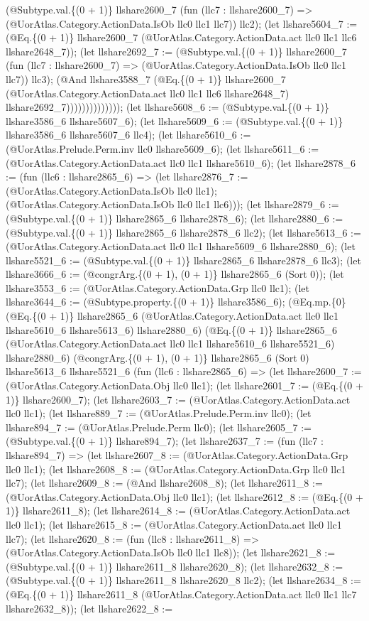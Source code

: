 \documentclass[11pt]{article}
\begin{document}
(@Subtype.val.\{(0 + 1)\} llshare2600\_7 (fun (llc7 : llshare2600\_7) => (@UorAtlas.Category.ActionData.IsOb llc0 llc1 llc7)) llc2); (let llshare5604\_7 := (@Eq.\{(0 + 1)\} llshare2600\_7 (@UorAtlas.Category.ActionData.act llc0 llc1 llc6 llshare2648\_7)); (let llshare2692\_7 := (@Subtype.val.\{(0 + 1)\} llshare2600\_7 (fun (llc7 : llshare2600\_7) => (@UorAtlas.Category.ActionData.IsOb llc0 llc1 llc7)) llc3); (@And llshare3588\_7 (@Eq.\{(0 + 1)\} llshare2600\_7 (@UorAtlas.Category.ActionData.act llc0 llc1 llc6 llshare2648\_7) llshare2692\_7)))))))))))))); (let llshare5608\_6 := (@Subtype.val.\{(0 + 1)\} llshare3586\_6 llshare5607\_6); (let llshare5609\_6 := (@Subtype.val.\{(0 + 1)\} llshare3586\_6 llshare5607\_6 llc4); (let llshare5610\_6 := (@UorAtlas.Prelude.Perm.inv llc0 llshare5609\_6); (let llshare5611\_6 := (@UorAtlas.Category.ActionData.act llc0 llc1 llshare5610\_6); (let llshare2878\_6 := (fun (llc6 : llshare2865\_6) => (let llshare2876\_7 := (@UorAtlas.Category.ActionData.IsOb llc0 llc1); (@UorAtlas.Category.ActionData.IsOb llc0 llc1 llc6))); (let llshare2879\_6 := (@Subtype.val.\{(0 + 1)\} llshare2865\_6 llshare2878\_6); (let llshare2880\_6 := (@Subtype.val.\{(0 + 1)\} llshare2865\_6 llshare2878\_6 llc2); (let llshare5613\_6 := (@UorAtlas.Category.ActionData.act llc0 llc1 llshare5609\_6 llshare2880\_6); (let llshare5521\_6 := (@Subtype.val.\{(0 + 1)\} llshare2865\_6 llshare2878\_6 llc3); (let llshare3666\_6 := (@congrArg.\{(0 + 1), (0 + 1)\} llshare2865\_6 (Sort 0)); (let llshare3553\_6 := (@UorAtlas.Category.ActionData.Grp llc0 llc1); (let llshare3644\_6 := (@Subtype.property.\{(0 + 1)\} llshare3586\_6); (@Eq.mp.\{0\} (@Eq.\{(0 + 1)\} llshare2865\_6 (@UorAtlas.Category.ActionData.act llc0 llc1 llshare5610\_6 llshare5613\_6) llshare2880\_6) (@Eq.\{(0 + 1)\} llshare2865\_6 (@UorAtlas.Category.ActionData.act llc0 llc1 llshare5610\_6 llshare5521\_6) llshare2880\_6) (@congrArg.\{(0 + 1), (0 + 1)\} llshare2865\_6 (Sort 0) llshare5613\_6 llshare5521\_6 (fun (llc6 : llshare2865\_6) => (let llshare2600\_7 := (@UorAtlas.Category.ActionData.Obj llc0 llc1); (let llshare2601\_7 := (@Eq.\{(0 + 1)\} llshare2600\_7); (let llshare2603\_7 := (@UorAtlas.Category.ActionData.act llc0 llc1); (let llshare889\_7 := (@UorAtlas.Prelude.Perm.inv llc0); (let llshare894\_7 := (@UorAtlas.Prelude.Perm llc0); (let llshare2605\_7 := (@Subtype.val.\{(0 + 1)\} llshare894\_7); (let llshare2637\_7 := (fun (llc7 : llshare894\_7) => (let llshare2607\_8 := (@UorAtlas.Category.ActionData.Grp llc0 llc1); (let llshare2608\_8 := (@UorAtlas.Category.ActionData.Grp llc0 llc1 llc7); (let llshare2609\_8 := (@And llshare2608\_8); (let llshare2611\_8 := (@UorAtlas.Category.ActionData.Obj llc0 llc1); (let llshare2612\_8 := (@Eq.\{(0 + 1)\} llshare2611\_8); (let llshare2614\_8 := (@UorAtlas.Category.ActionData.act llc0 llc1); (let llshare2615\_8 := (@UorAtlas.Category.ActionData.act llc0 llc1 llc7); (let llshare2620\_8 := (fun (llc8 : llshare2611\_8) => (@UorAtlas.Category.ActionData.IsOb llc0 llc1 llc8)); (let llshare2621\_8 := (@Subtype.val.\{(0 + 1)\} llshare2611\_8 llshare2620\_8); (let llshare2632\_8 := (@Subtype.val.\{(0 + 1)\} llshare2611\_8 llshare2620\_8 llc2); (let llshare2634\_8 := (@Eq.\{(0 + 1)\} llshare2611\_8 (@UorAtlas.Category.ActionData.act llc0 llc1 llc7 llshare2632\_8)); (let llshare2622\_8 := 
\end{document}
